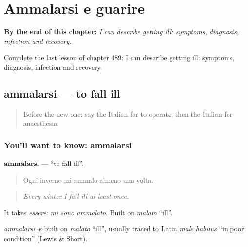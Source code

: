 
\chapter{Ammalarsi e guarire}
\label{ch:it-ammalarsi-e-guarire}

\begin{chapteropening}
\textbf{By the end of this chapter:} \emph{I can describe getting ill: symptoms, diagnosis, infection and recovery.}

Complete the last lesson of chapter 489: I can describe getting ill: symptoms, diagnosis, infection and recovery.
\end{chapteropening}

\section[ammalarsi]{ammalarsi — to fall ill}

\label{lesson:IT-C489-ammalarsi}



\begin{quote}
Before the new one: say the Italian for to operate, then the Italian for anaesthesia.
\end{quote}

\subsection*{You'll want to know: ammalarsi}
\textbf{ammalarsi} — \textquotedblleft{}to fall ill\textquotedblright{}.

\begin{quote}
Ogni inverno mi ammalo almeno una volta.
\end{quote}

\begin{quote}
\emph{Every winter I fall ill at least once.}
\end{quote}

It takes \emph{essere}: \emph{mi sono ammalato}. Built on \emph{malato} \textquotedblleft{}ill\textquotedblright{}.

\begin{cousinweb}
\emph{ammalarsi} is built on \emph{malato} \textquotedblleft{}ill\textquotedblright{}, usually traced to Latin \emph{male habitus} \textquotedblleft{}in poor condition\textquotedblright{} (Lewis \& Short).
\end{cousinweb}

